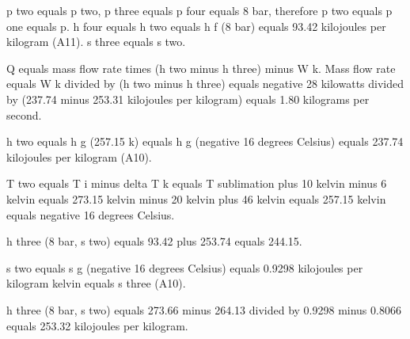 p two equals p two, p three equals p four equals 8 bar, therefore p two equals p one equals p.  
h four equals h two equals h f (8 bar) equals 93.42 kilojoules per kilogram (A11).  
s three equals s two.  

Q equals mass flow rate times (h two minus h three) minus W k.  
Mass flow rate equals W k divided by (h two minus h three) equals negative 28 kilowatts divided by (237.74 minus 253.31 kilojoules per kilogram) equals 1.80 kilograms per second.  

h two equals h g (257.15 k) equals h g (negative 16 degrees Celsius) equals 237.74 kilojoules per kilogram (A10).  

T two equals T i minus delta T k equals T sublimation plus 10 kelvin minus 6 kelvin equals 273.15 kelvin minus 20 kelvin plus 46 kelvin equals 257.15 kelvin equals negative 16 degrees Celsius.  

h three (8 bar, s two) equals 93.42 plus 253.74 equals 244.15.  

s two equals s g (negative 16 degrees Celsius) equals 0.9298 kilojoules per kilogram kelvin equals s three (A10).  

h three (8 bar, s two) equals 273.66 minus 264.13 divided by 0.9298 minus 0.8066 equals 253.32 kilojoules per kilogram.